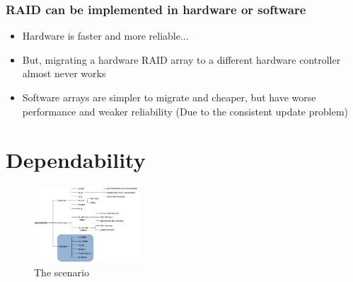 \documentclass[10pt, oneside]{article}
\begin{document}
\subsubsection{RAID can be implemented in hardware or software}\begin{itemize}
    \item Hardware is faster and more reliable...
    \item But, migrating a hardware RAID array to a different hardware controller almost never works
    \item Software arrays are simpler to migrate and cheaper, but have worse performance and weaker reliability (Due to the consistent update problem)
\end{itemize}
\newpage
\section{Dependability}
\begin{figure}[H]
    \begin{center}
    \includegraphics[width=0.35\textwidth]{img/img83.png}
    \caption{The scenario}
    \end{center}
\end{figure}
\end{document}
